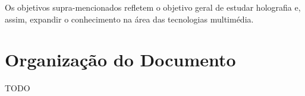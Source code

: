 Os objetivos supra-mencionados refletem o objetivo geral de estudar holografia e, assim, expandir o conhecimento na área das tecnologias multimédia.


\section{Organização do Documento}
\label{sec::intro:organiza}

TODO